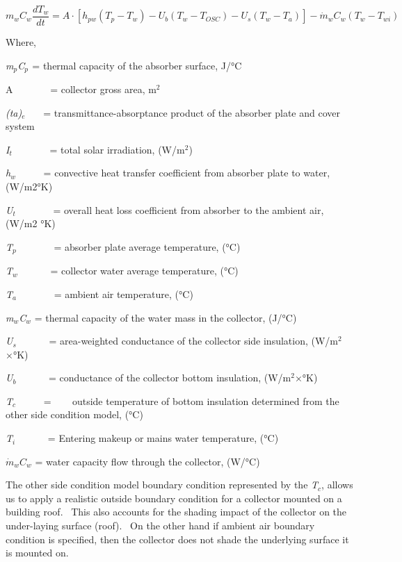 \begin{equation}
{m_w}{C_w}\frac{{d{T_w}}}{{dt}} = A \cdot \left[ {{h_{pw}}\left( {{T_p} - {T_w}} \right) - {U_b}\left( {{T_w} - {T_{OSC}}} \right) - {U_s}\left( {{T_w} - {T_a}} \right)} \right] - {\dot m_w}{C_w}\left( {{T_w} - {T_{wi}}} \right)
\end{equation}

Where,

\emph{m\(_{p}\)C\(_{p}\)}\(_{ }\) = thermal capacity of the absorber surface, J/°C

A~~~~~~~ = collector gross area, m\(^{2}\)

\emph{(ta)}\(_{e}\)~~~ = transmittance-absorptance product of the absorber plate and cover system

\emph{I\(_{t}\)}~~~~~~~ = total solar irradiation, (W/m\(^{2}\))

\emph{h\(_{w}\)}~~~~~ = convective heat transfer coefficient from absorber plate to water, (W/m2°K)

\emph{U\(_{t}\)}~~~~~~~ = overall heat loss coefficient from absorber to the ambient air, (W/m2 °K)

\emph{T\(_{p}\)}~~~~~~~ = absorber plate average temperature, (°C)

\emph{T\(_{w}\)}~~~~~~ = collector water average temperature, (°C)

\emph{T\(_{a}\)}~~~~~~~ = ambient air temperature, (°C)

\emph{m\(_{w}\)C\(_{w}\)} = thermal capacity of the water mass in the collector, (J/°C)

\emph{U\(_{s}\)}~~~~~~ = area-weighted conductance of the collector side insulation, (W/m\(^{2}\)×°K)

\emph{U\(_{b}\)}~~~~~~ = conductance of the collector bottom insulation, (W/m\(^{2}\)×°K)

\emph{T\(_{c}\)}~~~~~ = ~~~ outside temperature of bottom insulation determined from the other side condition model, (°C)

\emph{T\(_{i}\)}~~~~~~ = Entering makeup or mains water temperature, (°C)

\({\dot m_w}{C_w}\) = water capacity flow through the collector, (W/°C)

The other side condition model boundary condition represented by the \emph{T\(_{c}\)}, allows us to apply a realistic outside boundary condition for a collector mounted on a building roof.~ This also accounts for the shading impact of the collector on the under-laying surface (roof).~ On the other hand if ambient air boundary condition is specified, then the collector does not shade the underlying surface it is mounted on.

